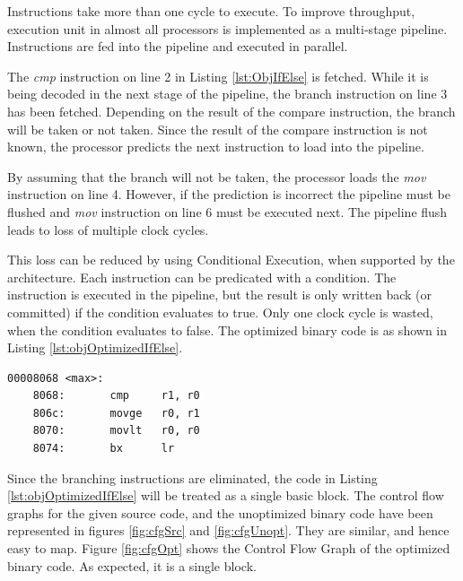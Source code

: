 Instructions take more than one cycle to execute. To improve throughput, execution unit in almost all processors is implemented as a multi-stage pipeline. Instructions are fed into the pipeline and executed in parallel.

The \emph{cmp} instruction on line 2 in Listing \ref{lst:ObjIfElse} is fetched. While it is being decoded in the next stage of the pipeline, the branch instruction on line 3 has been fetched. Depending on the result of the compare instruction, the branch will be taken or not taken. Since the result of the compare instruction is not known, the processor predicts the next instruction to load into the pipeline.

By assuming that the branch will not be taken, the processor loads the \emph{mov} instruction on line 4. However, if the prediction is incorrect the pipeline must be flushed and \emph{mov} instruction on line 6 must be executed next. The pipeline flush leads to loss of multiple clock cycles.

This loss can be reduced by using Conditional Execution, when supported by the architecture. Each instruction can be predicated with a condition. The instruction is executed in the pipeline, but the result is only written back (or committed) if the condition evaluates to true. Only one clock cycle is wasted, when the condition evaluates to false. The optimized binary code is as shown in Listing \ref{lst:objOptimizedIfElse}.

\begin{center}
\begin{minipage}{0.7\textwidth}
\begin{lstlisting}[caption={Optimized Object Code},label={lst:objOptimizedIfElse}]
00008068 <max>:
    8068:       cmp     r1, r0
    806c:       movge   r0, r1
    8070:       movlt   r0, r0
    8074:       bx      lr
\end{lstlisting}
\end{minipage}
\end{center}
\vspace*{-15pt}

Since the branching instructions are eliminated, the code in Listing \ref{lst:objOptimizedIfElse} will be treated as a single basic block. The control flow graphs for the given source code, and the unoptimized binary code have been represented in figures \ref{fig:cfgSrc} and \ref{fig:cfgUnopt}. They are similar, and hence easy to map. Figure \ref{fig:cfgOpt} shows the Control Flow Graph of the optimized binary code. As expected, it is a single block. 

